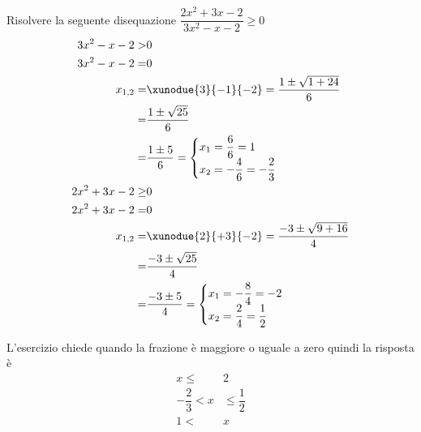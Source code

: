 	Risolvere la seguente disequazione $\dfrac{2x^2+3x-2}{3x^2-x-2}\geq 0$
\begin{align*}
3x^2-x-2>&0\\
3x^2-x-2=&0\\
x_{1,2}=&\xunodue{3}{-1}{-2}=\dfrac{1\pm\sqrt{1+24}}{6}\\
=&\dfrac{1\pm\sqrt{25}}{6}\\
=&\dfrac{1\pm 5}{6}=\begin{cases}
x_1=\dfrac{6}{6}=1\\
x_2=-\dfrac{4}{6}=-\dfrac{2}{3}
\end{cases}\\
2x^2+3x-2\geq&0\\
2x^2+3x-2=&0\\
x_{1,2}=&\xunodue{2}{+3}{-2}=\dfrac{-3\pm\sqrt{9+16}}{4}\\
=&\dfrac{-3\pm\sqrt{25}}{4}\\
=&\dfrac{-3\pm 5}{4}=\begin{cases}
x_1=-\dfrac{8}{4}=-2\\
x_2=\dfrac{2}{4}=\dfrac{1}{2}
\end{cases}\\
\end{align*}
\begin{center}
	
\end{center}
L'esercizio chiede quando la frazione è maggiore o uguale a zero quindi la risposta è
\begin{align*}
x\leq& 2\\ -\dfrac{2}{3}<x&\leq \dfrac{1}{2}\\ 1<&x\\
\end{align*}
